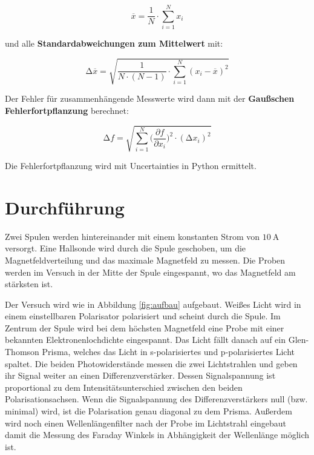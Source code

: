 \begin{equation}
	\overline{x} = \frac{1}{N} \cdot \sum_{i=1}^N x_i
	\label{eqn:Mittelwert}
\end{equation}

und alle \textbf{Standardabweichungen zum Mittelwert} mit:

\begin{equation}
	\increment\overline{x} = \sqrt{\frac{1}{N\cdot(N-1)}\cdot\sum_{i=1}^N (x_i-\overline{x})^2}
	\label{eqn:St_Mittelwert}
\end{equation}

Der Fehler für zusammenhängende Messwerte wird dann mit der \textbf{Gaußschen
	Fehlerfortpflanzung} berechnet:

\begin{equation}
	\increment{f} = \sqrt{ \sum_{i = 1}^{N}  \biggl(\frac{\partial{f}}{\partial{x_i}}\biggr)^2\cdot(\increment{x_i})^2}
	\label{eqn:Gauss}
\end{equation}

Die Fehlerfortpflanzung wird mit Uncertainties in Python \cite{uncertainties}
ermittelt.


\section{Durchführung\cite{man}}%
Zwei Spulen werden hintereinander mit einem konstanten Strom von
$\qty{10}{\ampere}$ versorgt. Eine Hallsonde wird durch die Spule geschoben, um
die Magnetfeldverteilung und das maximale Magnetfeld zu messen. Die Proben werden im Versuch in der
Mitte der Spule eingespannt, wo das Magnetfeld am stärksten ist.

Der Versuch wird wie in Abbildung \ref{fig:aufbau} aufgebaut. Weißes Licht wird
in einem einstellbaren Polarisator polarisiert und scheint durch die Spule. Im
Zentrum der Spule wird bei dem höchsten Magnetfeld eine Probe mit einer
bekannten Elektronenlochdichte eingespannt. Das Licht fällt danach auf ein
Glen-Thomson Prisma, welches das Licht in s-polarisiertes und p-polarisiertes
Licht spaltet. Die beiden Photowiderstände messen die zwei Lichtstrahlen und
geben ihr Signal weiter an einen Differenzverstärker. Dessen Signalspannung ist
proportional zu dem Intensitätsunterschied zwischen den beiden
Polarisationsachsen. Wenn die Signalspannung des Differenzverstärkers null
(bzw. minimal) wird, ist die Polarisation genau diagonal zu dem Prisma.
Außerdem wird noch einen Wellenlängenfilter nach der Probe im Lichtstrahl
eingebaut damit die Messung des Faraday Winkels in Abhängigkeit der Wellenlänge
möglich ist.

